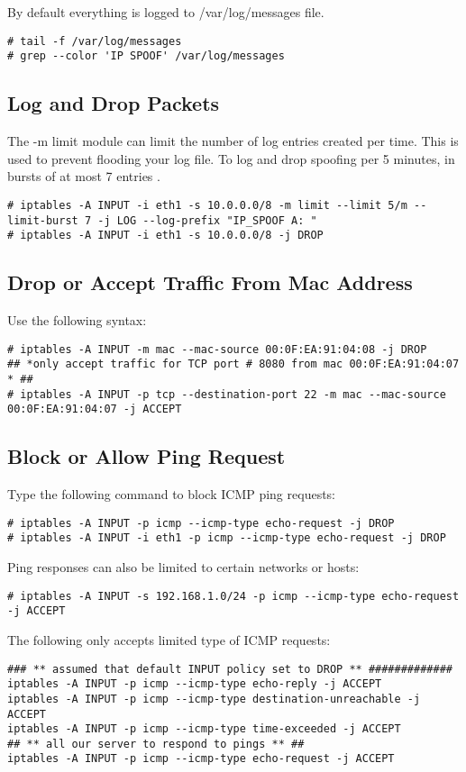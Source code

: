 \documentclass[dvipdfm]{book}
\begin{document}
By default everything is logged to /var/log/messages file.
\begin{verbatim}
# tail -f /var/log/messages
# grep --color 'IP SPOOF' /var/log/messages
\end{verbatim}

\subsection{Log and Drop Packets}

The -m limit module can limit the number of log entries created per
time. This is used to prevent flooding your log file. To log and drop
spoofing per 5 minutes, in bursts of at most 7 entries .
\begin{verbatim}
# iptables -A INPUT -i eth1 -s 10.0.0.0/8 -m limit --limit 5/m --limit-burst 7 -j LOG --log-prefix "IP_SPOOF A: "
# iptables -A INPUT -i eth1 -s 10.0.0.0/8 -j DROP
\end{verbatim}

\subsection{Drop or Accept Traffic From Mac Address}

Use the following syntax:
\begin{verbatim}
# iptables -A INPUT -m mac --mac-source 00:0F:EA:91:04:08 -j DROP
## *only accept traffic for TCP port # 8080 from mac 00:0F:EA:91:04:07 * ##
# iptables -A INPUT -p tcp --destination-port 22 -m mac --mac-source 00:0F:EA:91:04:07 -j ACCEPT
\end{verbatim}

\subsection{Block or Allow Ping Request}

Type the following command to block ICMP ping requests:
\begin{verbatim}
# iptables -A INPUT -p icmp --icmp-type echo-request -j DROP
# iptables -A INPUT -i eth1 -p icmp --icmp-type echo-request -j DROP
\end{verbatim}

Ping responses can also be limited to certain networks or hosts:
\begin{verbatim}
# iptables -A INPUT -s 192.168.1.0/24 -p icmp --icmp-type echo-request -j ACCEPT
\end{verbatim}

The following only accepts limited type of ICMP requests:
\begin{verbatim}
### ** assumed that default INPUT policy set to DROP ** #############
iptables -A INPUT -p icmp --icmp-type echo-reply -j ACCEPT
iptables -A INPUT -p icmp --icmp-type destination-unreachable -j ACCEPT
iptables -A INPUT -p icmp --icmp-type time-exceeded -j ACCEPT
## ** all our server to respond to pings ** ##
iptables -A INPUT -p icmp --icmp-type echo-request -j ACCEPT
\end{verbatim}
\end{document}
